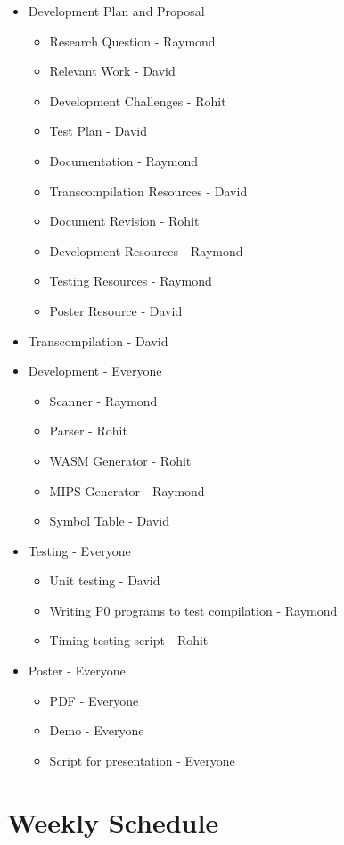 \documentclass{article}
\begin{document}
\begin{itemize}
  \item Development Plan and Proposal
  \begin{itemize}
    \item Research Question - Raymond
    \item Relevant Work - David
    \item Development Challenges - Rohit
    \item Test Plan - David
    \item Documentation - Raymond
    \item Transcompilation Resources - David
     \item Document Revision - Rohit
    \item Development Resources - Raymond
    \item Testing Resources - Raymond
    \item Poster Resource - David
  \end{itemize}
  \item Transcompilation - David
  \item Development - Everyone
  \begin{itemize}
    \item Scanner - Raymond
    \item Parser - Rohit
    \item WASM Generator - Rohit 
    \item MIPS Generator - Raymond
    \item Symbol Table - David
  \end{itemize}
  \item Testing - Everyone
  \begin{itemize}
    \item Unit testing - David
    \item Writing P0 programs to test compilation - Raymond
    \item Timing testing script - Rohit
  \end{itemize}
  \item Poster - Everyone
  \begin{itemize}
    \item PDF - Everyone
    \item Demo - Everyone
    \item Script for presentation - Everyone
  \end{itemize}
\end{itemize}

\section{Weekly Schedule}
\end{document}
